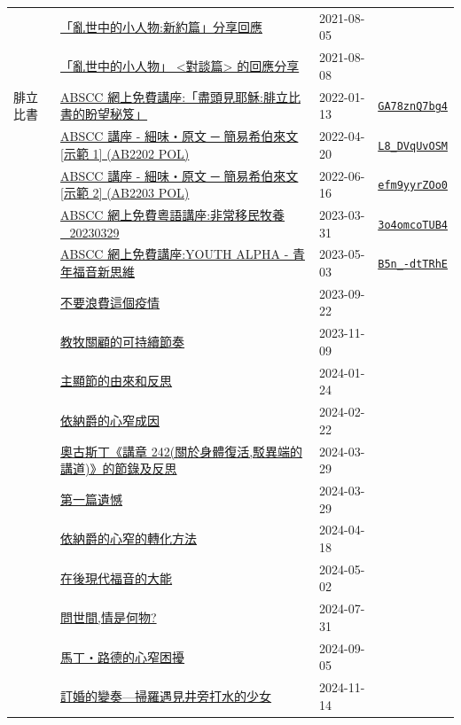 \documentclass{book}
\begin{document}
{\begin{xltabular}{\textwidth}{|p{0.15\textwidth} p{0.6\textwidth}|p{0.07\textwidth} p{0.1\textwidth}|}
    & \hyperref[sec:4]{「亂世中的小人物:新約篇」分享回應} & 2021-08-05 &  \\
    & \hyperref[sec:5]{「亂世中的小人物」 <對談篇> 的回應分享} & 2021-08-08 &  \\
腓立比書   & \hyperref[sec:GA78znQ7bg4]{ABSCC 網上免費講座:「盡頭見耶穌:腓立比書的盼望秘笈」} & 2022-01-13 & \href{https://youtube.com/watch?v=GA78znQ7bg4}{\texttt{GA78znQ7bg4}} \\
    & \hyperref[sec:L8_DVqUvOSM]{ABSCC 講座 - 細味‧原文 ─ 簡易希伯來文 [示範 1] (AB2202 POL)} & 2022-04-20 & \href{https://youtube.com/watch?v=L8_DVqUvOSM}{\texttt{L8\_DVqUvOSM}} \\
    & \hyperref[sec:efm9yyrZOo0]{ABSCC 講座 - 細味‧原文 ─ 簡易希伯來文 [示範 2] (AB2203 POL)} & 2022-06-16 & \href{https://youtube.com/watch?v=efm9yyrZOo0}{\texttt{efm9yyrZOo0}} \\
    & \hyperref[sec:3o4omcoTUB4]{ABSCC 網上免費粵語講座:非常移民牧養\_20230329} & 2023-03-31 & \href{https://youtube.com/watch?v=3o4omcoTUB4}{\texttt{3o4omcoTUB4}} \\
    & \hyperref[sec:B5n__dtTRhE]{ABSCC 網上免費講座:YOUTH ALPHA - 青年福音新思維} & 2023-05-03 & \href{https://youtube.com/watch?v=B5n_-dtTRhE}{\texttt{B5n\_-dtTRhE}} \\
    & \hyperref[sec:6]{不要浪費這個疫情} & 2023-09-22 &  \\
    & \hyperref[sec:7]{教牧關顧的可持續節奏} & 2023-11-09 &  \\
    & \hyperref[sec:8]{主顯節的由來和反思} & 2024-01-24 &  \\
    & \hyperref[sec:9]{依納爵的心窄成因} & 2024-02-22 &  \\
    & \hyperref[sec:10]{奧古斯丁《講章 242(關於身體復活,駁異端的講道)》的節錄及反思} & 2024-03-29 &  \\
    & \hyperref[sec:11]{第一篇遺憾} & 2024-03-29 &  \\
    & \hyperref[sec:12]{依納爵的心窄的轉化方法} & 2024-04-18 &  \\
    & \hyperref[sec:13]{在後現代福音的大能} & 2024-05-02 &  \\
    & \hyperref[sec:14]{問世間,情是何物?} & 2024-07-31 &  \\
    & \hyperref[sec:15]{馬丁‧路德的心窄困擾} & 2024-09-05 &  \\
    & \hyperref[sec:16]{訂婚的變奏—掃羅遇見井旁打水的少女} & 2024-11-14 &  \\
\end{xltabular}
}
\newpage
\end{document}
